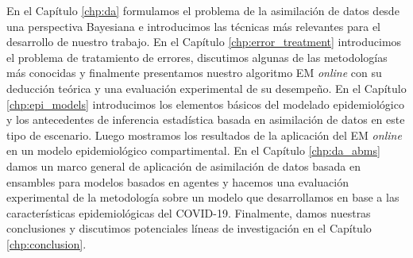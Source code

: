 En el Capítulo \ref{chp:da} formulamos el problema de la asimilación de datos desde una perspectiva Bayesiana e introducimos las técnicas más relevantes para el desarrollo de nuestro trabajo. En el Capítulo \ref{chp:error_treatment} introducimos el problema de tratamiento de errores, discutimos algunas de las metodologías más conocidas y finalmente presentamos nuestro algoritmo EM \textit{online} con su deducción teórica y una evaluación experimental de su desempeño. En el Capítulo \ref{chp:epi_models} introducimos los elementos básicos del modelado epidemiológico y los antecedentes de inferencia estadística basada en asimilación de datos en este tipo de escenario. Luego mostramos los resultados de la aplicación del EM \textit{online} en un modelo epidemiológico compartimental. En el Capítulo \ref{chp:da_abms} damos un marco general de aplicación de asimilación de datos basada en ensambles para modelos basados en agentes y hacemos una evaluación experimental de la metodología sobre un modelo que desarrollamos en base a las características epidemiológicas del COVID-19. Finalmente, damos nuestras conclusiones y discutimos potenciales líneas de investigación en el Capítulo \ref{chp:conclusion}.
